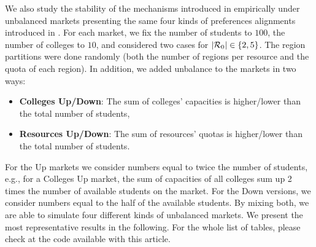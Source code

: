 We also study the stability of the mechanisms introduced in  empirically under unbalanced markets presenting the same four kinds of preferences alignments introduced in . For each market, we fix the number of students to $100$, the number of colleges to $10$, and considered two cases for $|{\operatorname{{\color{black}\mathcal{R}}}_0}| \in \{2,5\}$. The region partitions were done randomly (both the number of regions per resource and the quota of each region). In addition, we added unbalance to the markets in two ways:
\begin{itemize}
    \item \textbf{Colleges Up/Down}: The sum of colleges' capacities is higher/lower than the total number of students,
    \item \textbf{Resources Up/Down}: The sum of resources' quotas is higher/lower than the total number of students.
\end{itemize}
For the Up markets we consider numbers equal to twice the number of students, e.g., for a Colleges Up market, the sum of capacities of all colleges sum up 2 times the number of available students on the market. For the Down versions, we consider numbers equal to the half of the available students. By mixing both, we are able to simulate four different kinds of unbalanced markets. We present the most representative results in the following. For the whole list of tables, please check at the code available with this article.

